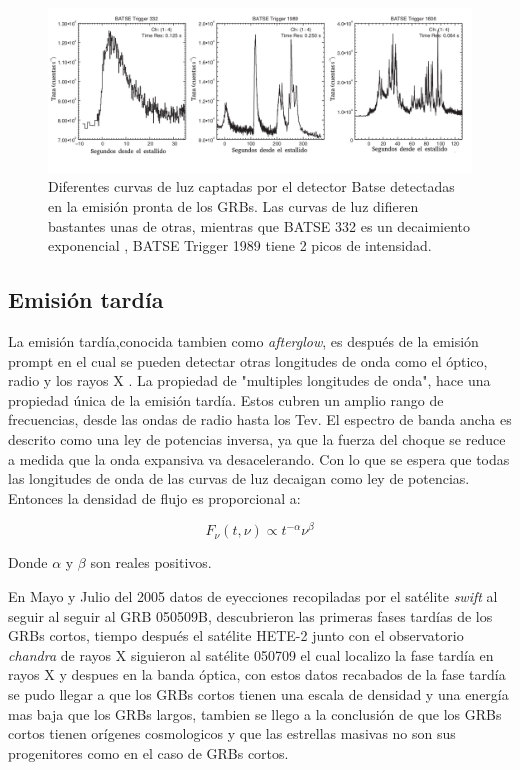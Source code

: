 \documentclass[12pt,a4paper]{book}
\begin{document}
\begin{figure}
\centering %
\includegraphics[width=1.0\textwidth]{Figuras/lightcurve_different}
\caption{\label{lightcurve} Diferentes curvas de luz captadas por el detector Batse detectadas en la emisión pronta de los GRBs. Las curvas de luz difieren bastantes unas de otras, mientras que BATSE 332 es un decaimiento exponencial , BATSE Trigger 1989  tiene 2 picos de intensidad. }
\end{figure}
\subsection{Emisión tardía}
La emisión tardía,conocida tambien como \emph{afterglow},  es después de la emisión prompt en el cual se pueden detectar otras longitudes de onda como el óptico, radio y los rayos X \cite{Berger:2013jza, PGRB-piran, SGRBr-Avanzo}. %
La propiedad de "multiples longitudes de onda", hace una propiedad única de la emisión tardía. Estos cubren un amplio rango de frecuencias, desde las ondas de radio hasta los Tev. El espectro de banda ancha es descrito como una ley de potencias inversa, ya que la fuerza del choque se reduce a medida que la onda expansiva va desacelerando. Con lo que se espera que todas las longitudes de onda de las curvas de luz decaigan como ley de potencias. Entonces la densidad de flujo es proporcional a:

\begin{equation}
F_{\nu}(t,\nu) \propto t^{-\alpha} \nu^{\beta}
\end{equation}

Donde $\alpha$ y $\beta$ son reales positivos.


En Mayo y Julio del 2005 datos de eyecciones recopiladas por el satélite \emph{swift} al seguir al seguir al GRB 050509B, descubrieron las primeras fases tardías de los GRBs cortos, tiempo después el satélite HETE-2 junto con el observatorio \emph{chandra} de rayos X siguieron al satélite 050709 el cual localizo la fase tardía en rayos X y despues en la banda óptica, con estos datos recabados de la fase tardía se pudo llegar a que los GRBs cortos tienen una escala de densidad y una energía mas baja que los GRBs largos, tambien se llego a la conclusión de que los GRBs cortos tienen orígenes cosmologicos \cite{Berger:2013jza} y que las estrellas masivas no son sus progenitores como en el caso de GRBs cortos.
 
\end{document}
